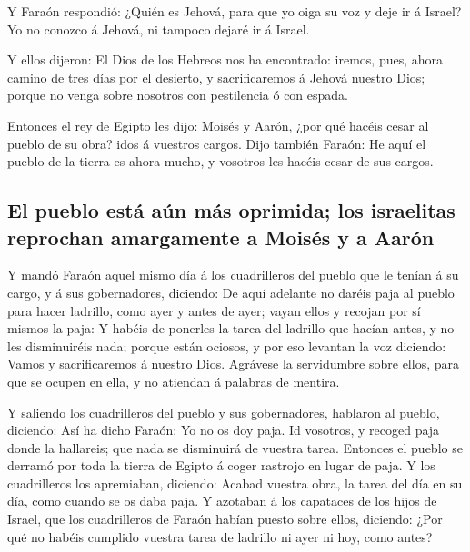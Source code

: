  Y Faraón respondió: ¿Quién es Jehová, para que yo oiga su
voz y deje ir á Israel? Yo no conozco á Jehová, ni tampoco dejaré ir á
Israel.

 Y ellos dijeron: El Dios de los Hebreos nos ha encontrado:
iremos, pues, ahora camino de tres días por el desierto, y
sacrificaremos á Jehová nuestro Dios; porque no venga sobre nosotros con
pestilencia ó con espada.

 Entonces el rey de Egipto les dijo: Moisés y Aarón, ¿por
qué hacéis cesar al pueblo de su obra? idos á vuestros cargos.
 Dijo también Faraón: He aquí el pueblo de la tierra es
ahora mucho, y vosotros les hacéis cesar de sus cargos.

\hypertarget{el-pueblo-estuxe1-auxfan-muxe1s-oprimida-los-israelitas-reprochan-amargamente-a-moisuxe9s-y-a-aaruxf3n}{%
\subsection{El pueblo está aún más oprimida; los israelitas reprochan
amargamente a Moisés y a
Aarón}\label{el-pueblo-estuxe1-auxfan-muxe1s-oprimida-los-israelitas-reprochan-amargamente-a-moisuxe9s-y-a-aaruxf3n}}

 Y mandó Faraón aquel mismo día á los cuadrilleros del
pueblo que le tenían á su cargo, y á sus gobernadores, diciendo:
 De aquí adelante no daréis paja al pueblo para hacer
ladrillo, como ayer y antes de ayer; vayan ellos y recojan por sí mismos
la paja:  Y habéis de ponerles la tarea del ladrillo que
hacían antes, y no les disminuiréis nada; porque están ociosos, y por
eso levantan la voz diciendo: Vamos y sacrificaremos á nuestro Dios.
 Agrávese la servidumbre sobre ellos, para que se ocupen en
ella, y no atiendan á palabras de mentira.

 Y saliendo los cuadrilleros del pueblo y sus gobernadores,
hablaron al pueblo, diciendo: Así ha dicho Faraón: Yo no os doy paja.
 Id vosotros, y recoged paja donde la hallareis; que nada
se disminuirá de vuestra tarea.  Entonces el pueblo se
derramó por toda la tierra de Egipto á coger rastrojo en lugar de paja.
 Y los cuadrilleros los apremiaban, diciendo: Acabad
vuestra obra, la tarea del día en su día, como cuando se os daba paja.
 Y azotaban á los capataces de los hijos de Israel, que los
cuadrilleros de Faraón habían puesto sobre ellos, diciendo: ¿Por qué no
habéis cumplido vuestra tarea de ladrillo ni ayer ni hoy, como antes?


